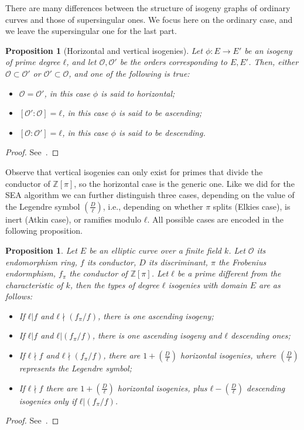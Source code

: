 \documentclass[10pt]{article}
\theoremstyle{plain}
\newtheorem{proposition}[theorem]{Proposition}
\theoremstyle{definition}
\def\O{\ensuremath{\mathcal{O}}}
\begin{document}
There are many differences between the structure of isogeny graphs of
ordinary curves and those of supersingular ones. %
We focus here on the ordinary case, and we leave the supersingular one
for the last part.

\begin{proposition}[Horizontal and vertical isogenies]
  Let $ϕ:E\to E'$ be an isogeny of prime degree $ℓ$, and let $\O,\O'$
  be the orders corresponding to $E,E'$. %
  Then, either $\O⊂\O'$ or $\O'⊂\O$, and one of the following is true:
  \begin{itemize}
  \item $\O=\O'$, in this case $ϕ$ is said to \emph{horizontal};
  \item $[\O':\O]=ℓ$, in this case $ϕ$ is said to be \emph{ascending};
  \item $[\O:\O']=ℓ$, in this case $ϕ$ is said to be \emph{descending}.
  \end{itemize}
\end{proposition}
\begin{proof}
  See~\cite[Prop.~21]{kohel}.
\end{proof}

Observe that vertical isogenies can only exist for primes that divide
the conductor of $ℤ[π]$, so the horizontal case is the generic one. %
Like we did for the SEA algorithm we can further distinguish three
cases, depending on the value of the Legendre symbol
$\left(\frac{D}{ℓ}\right)$, i.e., depending on whether $π$ splits
(Elkies case), is inert (Atkin case), or ramifies modulo $ℓ$. %
All possible cases are encoded in the following proposition.

\begin{proposition}
  Let $E$ be an elliptic curve over a finite field $k$. %
  Let $\O$ its endomorphism ring, $f$ its conductor, $D$ its
  discriminant, $π$ the Frobenius endormphism, $f_π$ the conductor of
  $ℤ[π]$. %
  Let $ℓ$ be a prime different from the characteristic of $k$, then
  the types of degree $ℓ$ isogenies with domain $E$ are as follows:
  \begin{itemize}
  \item If $ℓ|f$ and $ℓ\nmid(f_π/f)$, there is one ascending isogeny;
  \item If $ℓ|f$ and $ℓ|(f_π/f)$, there is one ascending isogeny and
    $ℓ$ descending ones;
  \item If $ℓ\nmid f$ and $ℓ\nmid(f_π/f)$, there are
    $1+\left(\frac{D}{ℓ}\right)$ horizontal isogenies, where
    $\left(\frac{D}{ℓ}\right)$ represents the Legendre symbol;
    \item If $ℓ\nmid f$ there are $1+\left(\frac{D}{ℓ}\right)$
      horizontal isogenies, plus $ℓ-\left(\frac{D}{ℓ}\right)$
      descending isogenies only if $ℓ|(f_π/f)$.
  \end{itemize}
\end{proposition}
\begin{proof}
  See~\cite[Prop.~21]{kohel}.
\end{proof}
\end{document}
